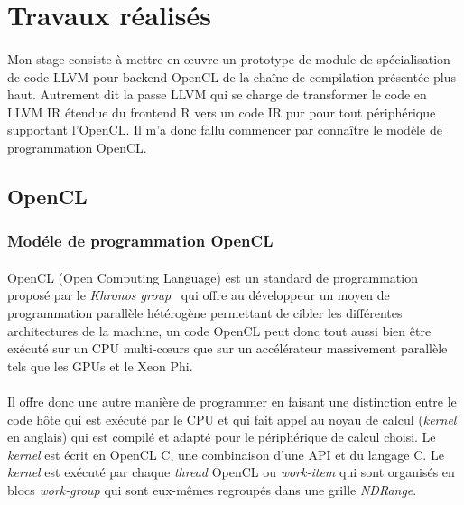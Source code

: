 \section{Travaux réalisés}
\paragraph{}
Mon stage consiste à mettre en \oe{}uvre un prototype de module de
spécialisation de code LLVM pour backend OpenCL de la chaîne de compilation
présentée plus haut. Autrement dit la passe LLVM qui se charge de transformer le
code en LLVM IR étendue du frontend R vers un code IR pur pour tout périphérique
supportant l'OpenCL. Il m'a donc fallu commencer par connaître le modèle de
programmation OpenCL.

\subsection{OpenCL}
\subsubsection{Modéle de programmation OpenCL}
\paragraph{}
OpenCL (Open Computing Language) est un standard de programmation proposé par le
\emph{Khronos group}~\cite{opencl} qui offre au développeur un moyen de
programmation parallèle hétérogène permettant de cibler les différentes
architectures de la machine, un code OpenCL peut donc tout aussi bien être
exécuté sur un CPU multi-c\oe{}urs que sur un accélérateur massivement parallèle
tels que les GPUs et le Xeon Phi.

\paragraph{}
Il offre donc une autre manière de programmer en faisant une distinction entre
le code hôte qui est exécuté par le CPU et qui fait appel au noyau de calcul
(\emph{kernel} en anglais) qui est compilé et adapté pour le périphérique de
calcul choisi. Le \emph{kernel} est écrit en OpenCL C, une combinaison d'une API
et du langage C. Le \emph{kernel} est exécuté par chaque \emph{thread} OpenCL ou
\emph{work-item} qui sont organisés en blocs \emph{work-group} qui sont
eux-mêmes regroupés dans une grille \emph{NDRange}.

